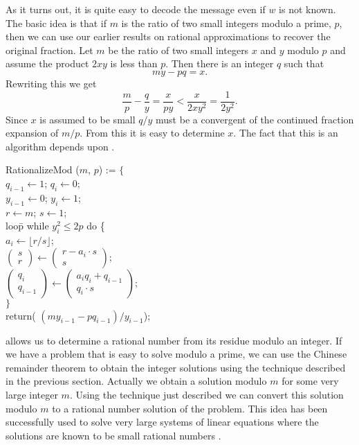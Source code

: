As it turns out, it is quite easy to decode the message even if $w$ is
not known.  The basic idea is that if $m$ is the ratio of two small
integers modulo a prime, $p$, then we can use our earlier results on
rational approximations to recover the original fraction.
Let $m$ be the ratio of two small integers $x$ and $y$ modulo $p$ and assume
the product $2xy$ is less than $p$.  Then there is an integer $q$ such that
\[
my - pq = x.
\]
Rewriting this we get
\[
\frac{m}{p} -  \frac{q}{y} = \frac{x}{p y} < \frac{x}{2 x y^2} 
  = \frac{1}{2 y^2}.
\]
Since $x$ is assumed to be small $q/ y$ must be a convergent of the
continued fraction expansion of $m/p$.  From this it is easy to
determine $x$.  The fact that this is an algorithm depends upon
.

\begindsacode
RationalizeMod ($m$, $p$) := $\{$ \\
\> $q_{i-1} \leftarrow 1$; $q_i \leftarrow 0$; \\
\> $y_{i-1} \leftarrow 0$; $y_i \leftarrow 1$; \\
\> $r \leftarrow m$; $s \leftarrow 1$; \\
\> loo\=p while $y_i^2 \le 2p$ do \{ \\
\>\> $a_i \leftarrow \lfloor r/s \rfloor$; \\
\>\> $\left(\!\!\begin{array}{c}s \\ r\end{array}\!\!\right) \leftarrow
   \left(\!\!\begin{array}{c} r - a_i \cdot s \\ s \end{array}\!\!\right)$; \\
\>\> $\left(\!\!\begin{array}{c}q_i \\ q_{i-1}\end{array}\!\!\right) \leftarrow
   \left(\!\!\begin{array}{c} a_i q_i + q_{i-1} \\ q_i \cdot s 
   \end{array}\!\!\right)$; \\
\>\> $\}$ \\
\> return( $(m y_{i-1} - p q_{i-1})/y_{i-1}$);
\enddsacode

 allows us to determine a rational number from
its residue modulo an integer.  If we have a problem that is easy to
solve modulo a prime, we can use the Chinese remainder theorem to
obtain the integer solutions using the technique described in the
previous section.  Actually we obtain a solution modulo $m$ for some
very large integer $m$.  Using the technique just described we can
convert this solution modulo $m$ to a rational number solution of the
problem.  This idea has been successfully used to solve very large
systems of linear equations where the solutions are known to be small
rational numbers \cite{Bender1977-yp}.

